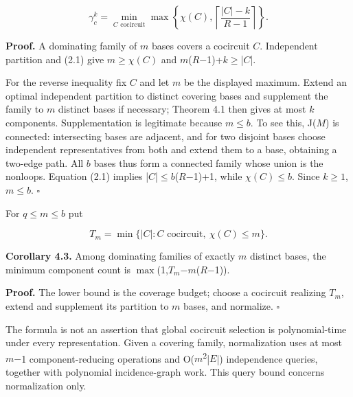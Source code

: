 \documentclass[11pt]{article}
\begin{document}
\[
\gamma_c^k=
\min_{C\text{ cocircuit}}
\max\left\{\chi(C),\left\lceil\frac{|C|-k}{R-1}\right\rceil\right\}.       \tag{4.2}
\]

\textbf{Proof.} A dominating family of \(m\) bases covers a cocircuit \(C\). Independent partition and (2.1) give \(m\)\(\ge\)\(\chi(C)\) and \(m\)(\(R\)\ensuremath{-}1)+\(k\)\(\ge\)|\(C\)|.

For the reverse inequality fix \(C\) and let \(m\) be the displayed maximum. Extend an optimal independent partition to distinct covering bases and supplement the family to \(m\) distinct bases if necessary; Theorem 4.1 then gives at most \(k\) components. Supplementation is legitimate because \(m\le b\). To see this, J(\(M\)) is connected: intersecting bases are adjacent, and for two disjoint bases choose independent representatives from both and extend them to a base, obtaining a two-edge path. All \(b\) bases thus form a connected family whose union is the nonloops. Equation (2.1) implies |\(C\)|\(\le\)\(b\)(\(R\)\ensuremath{-}1)+1, while \(\chi(C)\)\(\le\)\(b\). Since \(k\ge1\), \(m\le b\). \hfill\ensuremath{\square}

For \(q\le m\le b\) put

\[
T_m=\min\{|C|:C\text{ cocircuit},\ \chi(C)\le m\}.
\]

\textbf{Corollary 4.3.} Among dominating families of exactly \(m\) distinct bases, the minimum component count is \(\max\)(1,\(T_m\)\ensuremath{-}\(m\)(\(R\)\ensuremath{-}1)).

\textbf{Proof.} The lower bound is the coverage budget; choose a cocircuit realizing \(T_m\), extend and supplement its partition to \(m\) bases, and normalize. \hfill\ensuremath{\square}

The formula is not an assertion that global cocircuit selection is polynomial-time under every representation. Given a covering family, normalization uses at most \(m\)\ensuremath{-}1 component-reducing operations and O(\(m\)\textsuperscript{2}|\(E\)|) independence queries, together with polynomial incidence-graph work. This query bound concerns normalization only.

\end{document}
